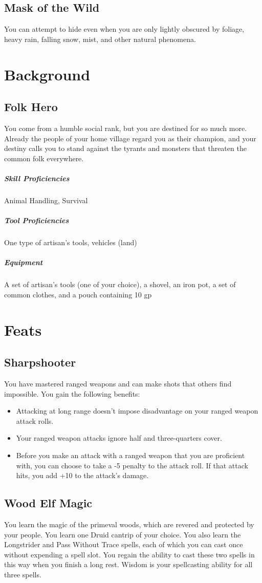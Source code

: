\documentclass[letterpaper,openany,oneside,twocolumn]{book}
\begin{document}
\subsection*{Mask of the Wild}
You can attempt to hide even when you are only lightly obscured by foliage, heavy rain, falling snow, mist, and other natural phenomena.

\section*{Background}
\subsection*{Folk Hero}
You come from a humble social rank, but you are destined for so much more. Already the people of your home village regard you as their champion, and your destiny calls you to stand against the tyrants and monsters that threaten the common folk everywhere.

\subparagraph*{Skill Proficiencies} Animal Handling, Survival
\subparagraph*{Tool Proficiencies} One type of artisan's tools, vehicles (land)
\subparagraph*{Equipment} A set of artisan's tools (one of your choice), a shovel, an iron pot, a set of common clothes, and a pouch containing 10 gp

\section*{Feats}
\subsection*{Sharpshooter}
You have mastered ranged weapons and can make shots that others find impossible. You gain the following benefits:
\begin{itemize}
  \item Attacking at long range doesn't impose disadvantage on your ranged weapon attack rolls.
  \item Your ranged weapon attacks ignore half and three-quarters cover.
  \item Before you make an attack with a ranged weapon that you are proficient with, you can choose to take a -5 penalty to the attack roll. If that attack hits, you add +10 to the attack's damage.
\end{itemize}

\subsection*{Wood Elf Magic}
You learn the magic of the primeval woods, which are revered and protected by your people. You learn one Druid cantrip of your choice. You also learn the Longstrider and Pass Without Trace spells, each of which you can cast once without expending a spell slot. You regain the ability to cast these two spells in this way when you finish a long rest. Wisdom is your spellcasting ability for all three spells.
\end{document}

